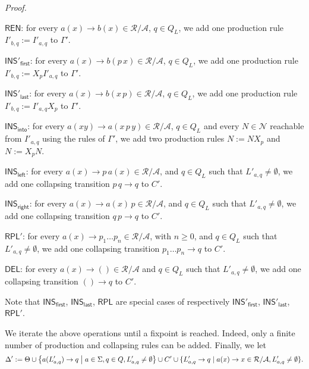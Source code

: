 \documentclass[a4paper]{article}
\theoremstyle{plain}
\newenvironment{proof}{\noindent\emph{Proof.}}{}
\newcommand{\R}{\mathcal{R}}
\newcommand{\N}{\mathcal{N}}
\newcommand{\F}{\Sigma}
\newcommand{\A}{\mathcal{A}}
\newcommand{\ptrs}[2]{{#1}{/}{#2}}
\newcommand{\INS}{\mathsf{INS}}
\newcommand{\REN}{\mathsf{REN}}
\newcommand{\RPL}{\mathsf{RPL}}
\newcommand{\DEL}{\mathsf{DEL}}
\begin{document}
\begin{proof}
\begin{description}

\item{$\REN$:} for every $a(x) \to b(x) \in  \ptrs{\R}{\A}$,
$q \in Q_L$, 
we add one production rule $I'_{b,q} := I'_{a,q}$ to $\Gamma'$.

\item{$\INS'_\mathsf{first}$:} for every $a(x) \to b(p\, x) \in  \ptrs{\R}{\A}$, 
$q \in Q_L$, 
we add one production rule $I'_{b,q} := X_p I'_{a,q}$ to $\Gamma'$.

\item{$\INS'_\mathsf{last}$:} for every $a(x) \to b(x\, p) \in  \ptrs{\R}{\A}$, 
$q \in Q_L$, 
we add one production rule $I'_{b,q} := I'_{a,q} X_p$ to $\Gamma'$.

\item{$\INS_\mathsf{into}$:} for every $a(xy) \to a(x\, p\, y) \in  \ptrs{\R}{\A}$,
$q \in Q_L$
and every $N \in \N$ reachable from $I'_{a, q}$ using the rules of $\Gamma'$, 
we add two production rules $N := N X_p$ and $N := X_p N$. 



\item{$\INS_\mathsf{left}$:} for every $a(x) \to p\, a(x) \in  \ptrs{\R}{\A}$, 
and $q \in Q_L$ 
such that $L'_{a,q} \neq \emptyset$,
we add one collapsing transition $p\,q \to q$ to $C'$.

\item{$\INS_\mathsf{right}$:} for every $a(x) \to a(x)\, p \in \ptrs{\R}{\A}$, 
and $q \in Q_L$ 
such that $L'_{a,q} \neq \emptyset$, 
we add one collapsing transition $q\, p \to q$ to $C'$.

\item{$\RPL'$:} for every $a(x) \to p_1 \ldots p_n \in \ptrs{\R}{\A}$, with $n \geq 0$,
and $q \in Q_L$ such that $L'_{a,q} \neq \emptyset$, 
we add one collapsing transition $p_1 \ldots p_n \to q$ to $C'$.

\item{$\DEL$:} for every $a(x) \to () \in \ptrs{\R}{\A}$
and $q \in Q_L$ such that $L'_{a,q} \neq \emptyset$, 
we add one collapsing transition $() \to q$ to $C'$.

\end{description}
Note that $\INS_\mathsf{first}$, $\INS_\mathsf{last}$, $\RPL$
are special cases of respectively
$\INS'_\mathsf{first}$, $\INS'_\mathsf{last}$, $\RPL'$.

We iterate the above operations until a fixpoint is reached.
Indeed, only a finite number of production and collapsing rules
can be added. Finally, we let 
\[ \Delta' := \Theta \cup
\bigl\{ a(L'_{a, q}) \to q \bigm| a \in \F, q \in Q, L'_{a, q} \neq \emptyset \bigr\}
\cup C' \cup \{ L'_{a, q} \to q \mid a(x) \to x \in \ptrs{\R}{\A}, L'_{a,q} \neq \emptyset \}. \]


\end{proof}
\end{document}
